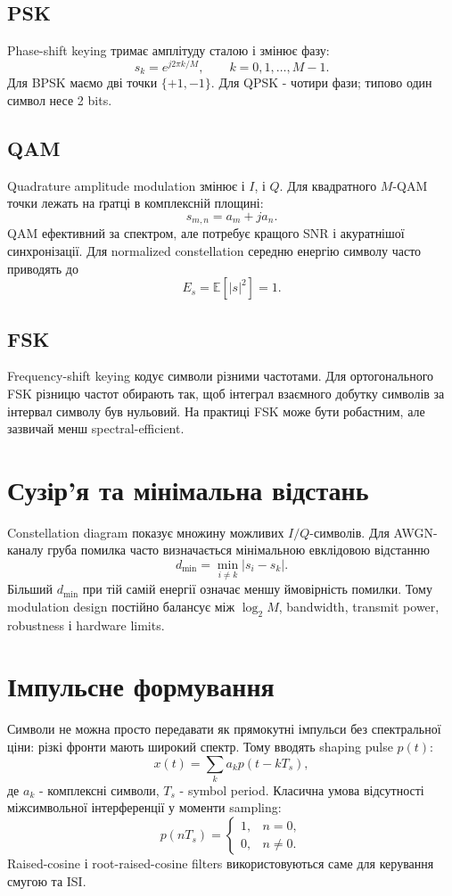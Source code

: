 \subsection{PSK}
Phase-shift keying тримає амплітуду сталою і змінює фазу:
\[
  s_k = e^{j2\pi k/M},\qquad k=0,1,\ldots,M-1.
\]
Для BPSK маємо дві точки $\{+1,-1\}$. Для QPSK - чотири фази; типово один символ несе 2 bits.

\subsection{QAM}
Quadrature amplitude modulation змінює і $I$, і $Q$. Для квадратного $M$-QAM точки лежать на ґратці в комплексній площині:
\[
  s_{m,n}=a_m + j a_n.
\]
QAM ефективний за спектром, але потребує кращого SNR і акуратнішої синхронізації. Для normalized constellation середню енергію символу часто приводять до
\[
  E_s = \mathbb E[|s|^2]=1.
\]

\subsection{FSK}
Frequency-shift keying кодує символи різними частотами. Для ортогонального FSK різницю частот обирають так, щоб інтеграл взаємного добутку символів за інтервал символу був нульовий. На практиці FSK може бути робастним, але зазвичай менш spectral-efficient.

\section{Сузір'я та мінімальна відстань}

Constellation diagram показує множину можливих $I/Q$-символів. Для AWGN-каналу груба помилка часто визначається мінімальною евклідовою відстанню
\[
  d_{\min}=\min_{i\ne k}|s_i-s_k|.
\]
Більший $d_{\min}$ при тій самій енергії означає меншу ймовірність помилки. Тому modulation design постійно балансує між $\log_2 M$, bandwidth, transmit power, robustness і hardware limits.

\section{Імпульсне формування}

Символи не можна просто передавати як прямокутні імпульси без спектральної ціни: різкі фронти мають широкий спектр. Тому вводять shaping pulse $p(t)$:
\[
  x(t)=\sum_{k} a_k p(t-kT_s),
\]
де $a_k$ - комплексні символи, $T_s$ - symbol period. Класична умова відсутності міжсимвольної інтерференції у моменти sampling:
\[
  p(nT_s)=\begin{cases}
  1, & n=0,\\
  0, & n\ne 0.
  \end{cases}
\]
Raised-cosine і root-raised-cosine filters використовуються саме для керування смугою та ISI.

